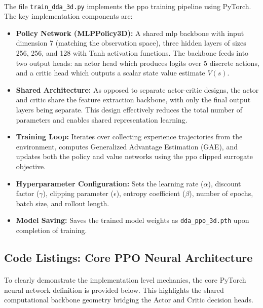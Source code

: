\paragraph{} The file \texttt{train\_dda\_3d.py} implements the \ac{ppo} training pipeline using PyTorch. The key implementation components are:

\begin{itemize}
	\item \textbf{Policy Network (MLPPolicy3D):} A shared \ac{mlp} backbone with input dimension 7 (matching the observation space), three hidden layers of sizes 256, 256, and 128 with Tanh activation functions. The backbone feeds into two output heads: an actor head which produces logits over 5 discrete actions, and a critic head which outputs a scalar state value estimate $V(s)$.
	\item \textbf{Shared Architecture:} As opposed to separate actor-critic designs, the actor and critic share the feature extraction backbone, with only the final output layers being separate. This design effectively reduces the total number of parameters and enables shared representation learning.
	\item \textbf{Training Loop:} Iterates over collecting experience trajectories from the environment, computes Generalized Advantage Estimation (GAE), and updates both the policy and value networks using the \ac{ppo} clipped surrogate objective.
	\item \textbf{Hyperparameter Configuration:} Sets the learning rate ($\alpha$), discount factor ($\gamma$), clipping parameter ($\epsilon$), entropy coefficient ($\beta$), number of epochs, batch size, and rollout length.
	\item \textbf{Model Saving:} Saves the trained model weights as \texttt{dda\_ppo\_3d.pth} upon completion of training.
\end{itemize}

\subsection{Code Listings: Core PPO Neural Architecture}
\paragraph{} To clearly demonstrate the implementation level mechanics, the core PyTorch neural network definition is provided below. This highlights the shared computational backbone geometry bridging the Actor and Critic decision heads.

